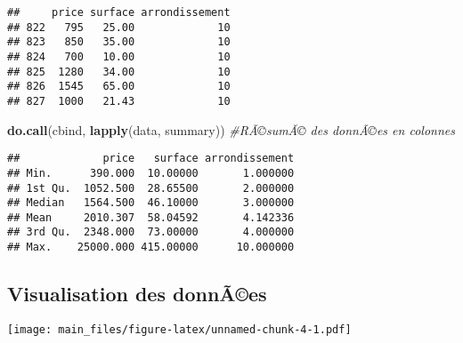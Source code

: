 \documentclass[]{article}
\newenvironment{Shaded}{\begin{snugshade}}{\end{snugshade}}
\newcommand{\KeywordTok}[1]{\textcolor[rgb]{0.13,0.29,0.53}{\textbf{#1}}}
\newcommand{\DataTypeTok}[1]{\textcolor[rgb]{0.13,0.29,0.53}{#1}}
\newcommand{\StringTok}[1]{\textcolor[rgb]{0.31,0.60,0.02}{#1}}
\newcommand{\CommentTok}[1]{\textcolor[rgb]{0.56,0.35,0.01}{\textit{#1}}}
\newcommand{\OperatorTok}[1]{\textcolor[rgb]{0.81,0.36,0.00}{\textbf{#1}}}
\newcommand{\NormalTok}[1]{#1}
\begin{document}
\begin{verbatim}
##     price surface arrondissement
## 822   795   25.00             10
## 823   850   35.00             10
## 824   700   10.00             10
## 825  1280   34.00             10
## 826  1545   65.00             10
## 827  1000   21.43             10
\end{verbatim}

\begin{Shaded}
\begin{Highlighting}[]
\KeywordTok{do.call}\NormalTok{(cbind, }\KeywordTok{lapply}\NormalTok{(data, summary)) }\CommentTok{#RÃ©sumÃ© des donnÃ©es en colonnes}
\end{Highlighting}
\end{Shaded}

\begin{verbatim}
##             price   surface arrondissement
## Min.      390.000  10.00000       1.000000
## 1st Qu.  1052.500  28.65500       2.000000
## Median   1564.500  46.10000       3.000000
## Mean     2010.307  58.04592       4.142336
## 3rd Qu.  2348.000  73.00000       4.000000
## Max.    25000.000 415.00000      10.000000
\end{verbatim}

\subsection{Visualisation des donnÃ©es}\label{visualisation-des-donnaes}

\begin{Shaded}
\end{Shaded}

\texttt{[image: main\_files/figure-latex/unnamed-chunk-4-1.pdf]}

\begin{Shaded}
\end{Shaded}
\end{document}
